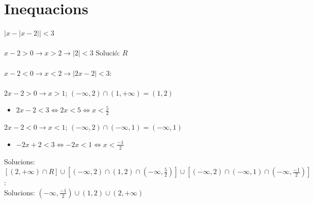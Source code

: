 \section{Inequacions}
$|x-|x-2|| < 3$\\
\\
$x-2 > 0 \longrightarrow x > 2 \longrightarrow |2| < 3$ Solució: $R$\\
\\
$x-2 < 0 \longrightarrow x < 2 \longrightarrow |2x -2| < 3$:\\
\\
$2x -2 > 0 \longrightarrow x > 1$; $(-\infty,2)\cap(1,+\infty) = (1,2)$\\
\begin{itemize}
\item $2x -2 < 3 \Leftrightarrow 2x < 5 \Leftrightarrow x < \frac{5}{2}$\\
\end{itemize}
$2x -2 < 0 \longrightarrow x < 1$; $(-\infty,2)\cap(-\infty,1) = (-\infty,1)$\\
\begin{itemize}
\item $-2x +2 < 3 \Leftrightarrow -2x < 1 \Leftrightarrow x < \frac{-1}{2}$\\
\end{itemize}
Solucions: $[(2,+\infty)\cap R]\cup[(-\infty,2)\cap(1,2)\cap(-\infty,\frac{5}{2})]\cup[(-\infty,2)\cap(-\infty,1)\cap(-\infty,\frac{-1}{2})]$:\\
Solucions: $(-\infty,\frac{-1}{2})\cup(1,2)\cup(2,+\infty)$